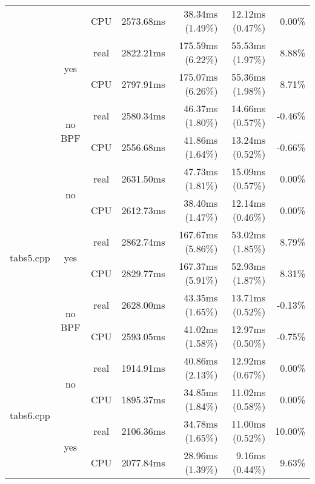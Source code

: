 \documentclass[en]{pracamgr}
\begin{document}
\begin{appendices}
\begin{small}
\begin{longtable}{|l|c|c|r|r|r|r|}
                            &                         & CPU  & 2573.68ms & 38.34ms (1.49\%) & 12.12ms (0.47\%) & 0.00\% \\*
                            \cline{2-7}
                            & \multirow{2}{*}{yes}    & real & 2822.21ms & 175.59ms (6.22\%) & 55.53ms (1.97\%) & 8.88\% \\*
                            &                         & CPU  & 2797.91ms & 175.07ms (6.26\%) & 55.36ms (1.98\%) & 8.71\% \\*
                            \cline{2-7}
                            & \multirow{2}{*}{no BPF} & real & 2580.34ms & 46.37ms (1.80\%) & 14.66ms (0.57\%) & -0.46\% \\*
                            &                         & CPU  & 2556.68ms & 41.86ms (1.64\%) & 13.24ms (0.52\%) & -0.66\% \\
\hline
\multirow{6}{*}{tabs5.cpp}  & \multirow{2}{*}{no}     & real & 2631.50ms & 47.73ms (1.81\%) & 15.09ms (0.57\%) & 0.00\% \\*
                            &                         & CPU  & 2612.73ms & 38.40ms (1.47\%) & 12.14ms (0.46\%) & 0.00\% \\*
                            \cline{2-7}
                            & \multirow{2}{*}{yes}    & real & 2862.74ms & 167.67ms (5.86\%) & 53.02ms (1.85\%) & 8.79\% \\*
                            &                         & CPU  & 2829.77ms & 167.37ms (5.91\%) & 52.93ms (1.87\%) & 8.31\% \\*
                            \cline{2-7}
                            & \multirow{2}{*}{no BPF} & real & 2628.00ms & 43.35ms (1.65\%) & 13.71ms (0.52\%) & -0.13\% \\*
                            &                         & CPU  & 2593.05ms & 41.02ms (1.58\%) & 12.97ms (0.50\%) & -0.75\% \\
\hline
\multirow{6}{*}{tabs6.cpp}  & \multirow{2}{*}{no}     & real & 1914.91ms & 40.86ms (2.13\%) & 12.92ms (0.67\%) & 0.00\% \\*
                            &                         & CPU  & 1895.37ms & 34.85ms (1.84\%) & 11.02ms (0.58\%) & 0.00\% \\*
                            \cline{2-7}
                            & \multirow{2}{*}{yes}    & real & 2106.36ms & 34.78ms (1.65\%) & 11.00ms (0.52\%) & 10.00\% \\*
                            &                         & CPU  & 2077.84ms & 28.96ms (1.39\%) & 9.16ms (0.44\%) & 9.63\% \\*

\end{longtable}
\end{small}
\end{appendices}
\end{document}
